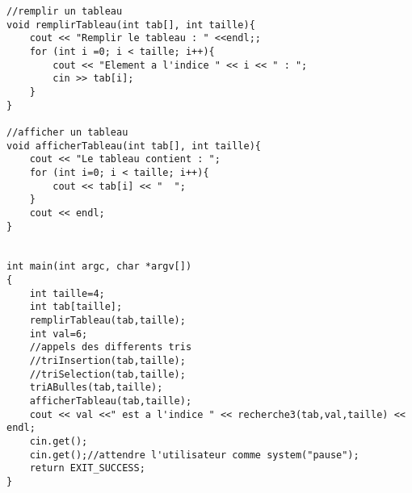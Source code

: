 \documentclass[french]{article}
\begin{document}
	\begin{lstlisting}[caption={Sous programmes supplémentaires}]
//remplir un tableau
void remplirTableau(int tab[], int taille){
    cout << "Remplir le tableau : " <<endl;;
    for (int i =0; i < taille; i++){
        cout << "Element a l'indice " << i << " : ";
        cin >> tab[i];
    }
}

//afficher un tableau
void afficherTableau(int tab[], int taille){
    cout << "Le tableau contient : ";
    for (int i=0; i < taille; i++){
        cout << tab[i] << "  ";
    }
    cout << endl;
}


int main(int argc, char *argv[])
{
    int taille=4;
    int tab[taille];
    remplirTableau(tab,taille);
    int val=6;
    //appels des differents tris
    //triInsertion(tab,taille);
    //triSelection(tab,taille);
    triABulles(tab,taille);
    afficherTableau(tab,taille);
    cout << val <<" est a l'indice " << recherche3(tab,val,taille) << endl;  
    cin.get();
    cin.get();//attendre l'utilisateur comme system("pause");
    return EXIT_SUCCESS;
}
	\end{lstlisting}
\end{document}
